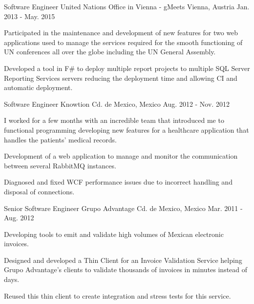 \begin{cventries}
  \cventry
    {Software Engineer} %
    {United Nations Office in Vienna - gMeets} %
    {Vienna, Austria} %
    {Jan. 2013 - May. 2015} %
    {}
    {
      \begin{cvitems} %
        \item {Participated in the maintenance and development of new features for two web applications used to manage the services required for the smooth functioning of UN conferences all over the globe including the UN General Assembly.}
        \item {Developed a tool in F\# to deploy multiple report projects to multiple SQL Server Reporting Services servers reducing the deployment time and allowing CI and automatic deployment.}
      \end{cvitems}
    }

  \cventry
    {Software Engineer} %
    {Knowtion} %
    {Cd. de Mexico, Mexico} %
    {Aug. 2012 - Nov. 2012} %
    {}
    {
      \begin{cvitems} %
        \item {I worked for a few months with an incredible team that introduced me to functional programming developing new features for a healthcare application that handles the patients’ medical records.}
        \item {Development of a web application to manage and monitor the communication between several RabbitMQ instances.}
        \item {Diagnosed and fixed WCF performance issues due to incorrect handling and disposal of connections.}
      \end{cvitems}
    }

  \cventry
    {Senior Software Engineer} %
    {Grupo Advantage} %
    {Cd. de Mexico, Mexico} %
    {Mar. 2011 - Aug. 2012} %
    {}
    {
      \begin{cvitems} %
        \item {Developing tools to emit and validate high volumes of Mexican electronic invoices.}
        \item {Designed and developed a Thin Client for an Invoice Validation Service helping Grupo Advantage's clients to validate thousands of invoices in minutes instead of days.}
        \item {Reused this thin client to create integration and stress tests for this service.}
      \end{cvitems}
    }


\end{cventries}
